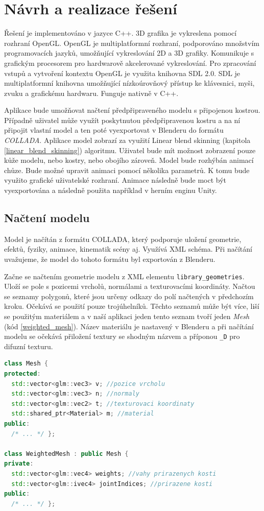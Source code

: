 \chapter{Návrh a realizace řešení}
Řešení je implementováno v jazyce C++. 3D grafika je vykreslena pomocí rozhraní OpenGL. OpenGL je multiplatformní rozhraní, podporováno množstvím programovacích jazyků, umožňující vykreslování 2D a 3D grafiky. Komunikuje s grafickým procesorem pro hardwarově akcelerované vykreslování. Pro zpracování vstupů a vytvoření kontextu OpenGL je využita knihovna SDL 2.0. SDL je multiplatformní knihovna umožňující nízkoúrovňový přístup ke klávesnici, myši, zvuku a grafickému hardwaru. Funguje nativně v C++.

Aplikace bude umožňovat načtení předpřipraveného modelu s připojenou kostrou. Případně uživatel může využít poskytnutou předpřipravenou kostru a na ní připojit vlastní model a ten poté vyexportovat v Blenderu do formátu \textit{COLLADA}. Aplikace model zobrazí za využití Linear blend skinning (kapitola \ref{linear_blend_skinning}) algoritmu. Uživatel bude mít možnost zobrazení pouze kůže modelu, nebo kostry, nebo obojího zároveň. Model bude rozhýbán animací chůze. Bude možné upravit animaci pomocí několika parametrů. K tomu bude využito grafické uživatelské rozhraní. Animace následně bude moct být vyexportována a následně použita například v herním enginu Unity.

\section{Načtení modelu}
Model je načítán z formátu COLLADA, který podporuje uložení geometrie, efektů, fyziky, animace, kinematik scény aj. Využívá XML schéma. Při načítání uvažujeme, že model do tohoto formátu byl exportován z Blenderu.

Začne se načtením geometrie modelu z XML elementu  \texttt{library\_geometries}. Uloží se pole s pozicemi vrcholů, normálami a texturovacími koordináty. Načtou se seznamy polygonů, které jsou určeny odkazy do polí načtených v předchozím kroku. Očekává se použití pouze trojúhelníků. Těchto seznamů může být více, liší se použitým materiálem a v naší aplikaci jeden tento seznam tvoří jeden  \textit{Mesh} (kód \ref{weighted_mesh}). Název materiálu je nastavený v Blenderu a při načítání modelu se očekává přiložení textury se shodným názvem a příponou \texttt{\_D} pro difuzní texturu.

\begin{lstlisting}[float,floatplacement=H,language=C++, caption={Třída modelu.}, label={weighted_mesh}]
class Mesh {
protected:
  std::vector<glm::vec3> v; //pozice vrcholu
  std::vector<glm::vec3> n; //normaly
  std::vector<glm::vec2> t; //texturovaci koordinaty
  std::shared_ptr<Material> m; //material
public:
  /* ... */ };
  
class WeightedMesh : public Mesh {
private:
  std::vector<glm::vec4> weights; //vahy prirazenych kosti
  std::vector<glm::ivec4> jointIndices; //prirazene kosti
public:
  /* ... */ };
\end{lstlisting}

